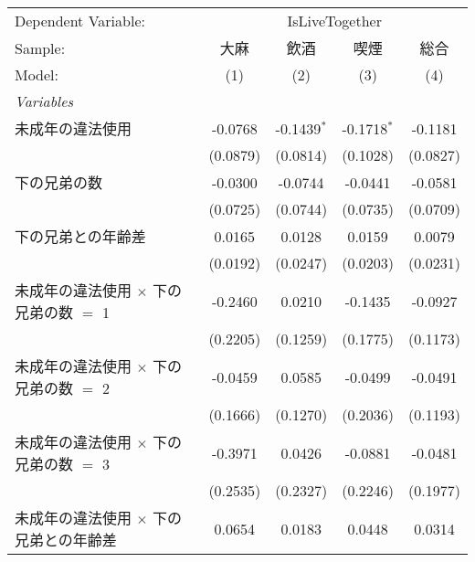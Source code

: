 \documentclass{article}
\begin{document}
\begingroup
\centering
\begin{threeparttable}[b]
   \begin{tabular}{lcccc}
      \tabularnewline \midrule \midrule
      Dependent Variable: & \multicolumn{4}{c}{IsLiveTogether}\\
      Sample:                                       & 大麻     & 飲酒          & 喫煙          & 総合 \\   
      Model:                                        & (1)      & (2)           & (3)           & (4)\\  
      \midrule
      \emph{Variables}\\
      未成年の違法使用                              & -0.0768  & -0.1439$^{*}$ & -0.1718$^{*}$ & -0.1181\\   
                                                    & (0.0879) & (0.0814)      & (0.1028)      & (0.0827)\\   
      下の兄弟の数                                  & -0.0300  & -0.0744       & -0.0441       & -0.0581\\   
                                                    & (0.0725) & (0.0744)      & (0.0735)      & (0.0709)\\   
      下の兄弟との年齢差                            & 0.0165   & 0.0128        & 0.0159        & 0.0079\\   
                                                    & (0.0192) & (0.0247)      & (0.0203)      & (0.0231)\\   
      未成年の違法使用 $\times$ 下の兄弟の数 $=$ 1  & -0.2460  & 0.0210        & -0.1435       & -0.0927\\   
                                                    & (0.2205) & (0.1259)      & (0.1775)      & (0.1173)\\   
      未成年の違法使用 $\times$ 下の兄弟の数 $=$ 2  & -0.0459  & 0.0585        & -0.0499       & -0.0491\\   
                                                    & (0.1666) & (0.1270)      & (0.2036)      & (0.1193)\\   
      未成年の違法使用 $\times$ 下の兄弟の数 $=$ 3  & -0.3971  & 0.0426        & -0.0881       & -0.0481\\   
                                                    & (0.2535) & (0.2327)      & (0.2246)      & (0.1977)\\   
      未成年の違法使用 $\times$ 下の兄弟との年齢差  & 0.0654   & 0.0183        & 0.0448        & 0.0314\\   

\end{tabular}
\end{threeparttable}
\end{document}
